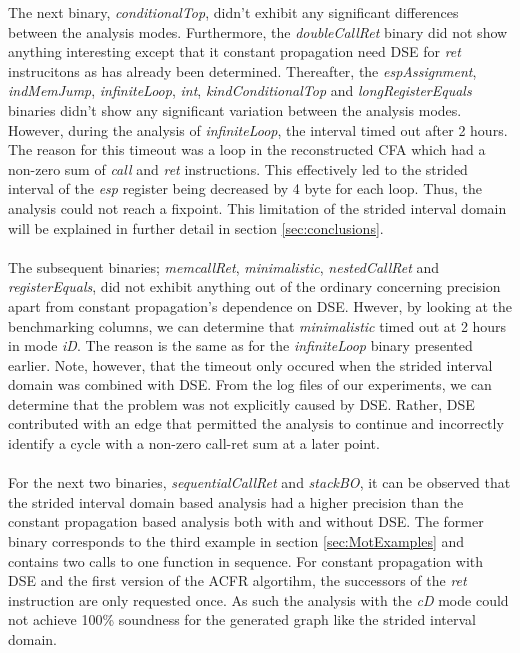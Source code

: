 \documentclass{kththesis}
\renewcommand{\it}[1]{\textit{#1}}
\begin{document}
The next binary, \it{conditionalTop}, didn't exhibit any significant differences between the analysis modes. Furthermore, the \it{doubleCallRet} binary did not show anything interesting except that it constant propagation need DSE for \it{ret} instrucitons as has already been determined. Thereafter, the \it{espAssignment}, \it{indMemJump}, \it{infiniteLoop}, \it{int}, \it{kindConditionalTop} and \it{longRegisterEquals} binaries didn't show any significant variation between the analysis modes. However, during the analysis of \it{infiniteLoop}, the interval timed out after 2 hours. The reason for this timeout was a loop in the reconstructed CFA which had a non-zero sum of \it{call} and \it{ret} instructions. This effectively led to the strided interval of the \it{esp} register being decreased by 4 byte for each loop. Thus, the analysis could not reach a fixpoint. This limitation of the strided interval domain will be explained in further detail in section \ref{sec:conclusions}.
\\ \\ 
The subsequent binaries; \it{memcallRet}, \it{minimalistic}, \it{nestedCallRet} and \it{registerEquals}, did not exhibit anything out of the ordinary concerning precision apart from constant propagation's dependence on DSE. Hwever, by looking at the benchmarking columns, we can determine that \it{minimalistic} timed out at 2 hours in mode \it{iD}. The reason is the same as for the \it{infiniteLoop} binary presented earlier. Note, however, that the timeout only occured when the strided interval domain was combined with DSE. From the log files of our experiments, we can determine that the problem was not explicitly caused by DSE. Rather, DSE contributed with an edge that permitted the analysis to continue and incorrectly identify a cycle with a non-zero call-ret sum at a later point. 
\\ \\
For the next two binaries, \it{sequentialCallRet} and \it{stackBO}, it can be observed that the strided interval domain based analysis had a higher precision than the constant propagation based analysis both with and without DSE. The former binary corresponds to the third example in section \ref{sec:MotExamples} and contains two calls to one function in sequence. For constant propagation with DSE and the first version of the ACFR algortihm, the successors of the \it{ret} instruction are only requested once. As such the analysis with the \it{cD} mode could not achieve 100\% soundness for the generated graph like the strided interval domain.
\end{document}
